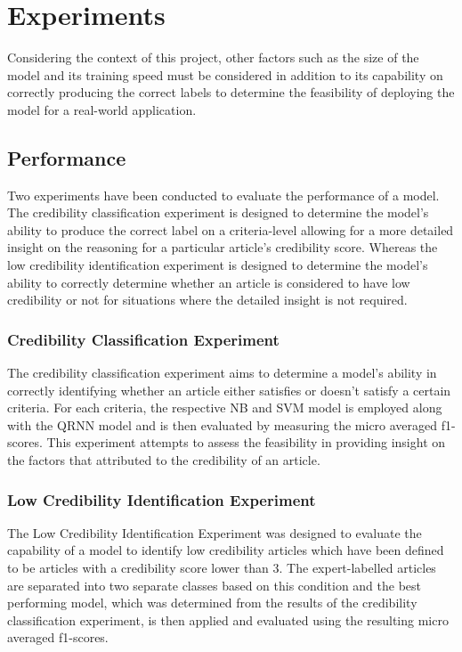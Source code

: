 \documentclass[a4paper,twoside,phd]{BYUPhys}
\begin{document}
\section{Experiments}
\label{sec:Experiments}

Considering the context of this project, other factors such as the size of the model and its training speed must be considered in addition to its capability on correctly producing the correct labels to determine the feasibility of deploying the model for a real-world application. 

\subsection{Performance}
\label{sec:PerformanceExperiments}

Two experiments have been conducted to evaluate the performance of a model. The credibility classification experiment is designed to determine the model's ability to produce the correct label on a criteria-level allowing for a more detailed insight on the reasoning for a particular article's credibility score. Whereas the low credibility identification experiment is designed to determine the model's ability to correctly determine whether an article is considered to have low credibility or not for situations where the detailed insight is not required.

\subsubsection{Credibility Classification Experiment}
\label{sec:CredibilityClassificationExperiment}
The credibility classification experiment aims to determine a model's ability in correctly identifying whether an article either satisfies or doesn't satisfy a certain criteria. For each criteria, the respective NB and SVM model is employed along with the QRNN model and is then evaluated by measuring the micro averaged f1-scores. This experiment attempts to assess the feasibility in providing insight on the factors that attributed to the credibility of an article.


\subsubsection{Low Credibility Identification Experiment}
\label{sec:LowCredibilityIdentification}
The Low Credibility Identification Experiment was designed to evaluate the capability of a model to identify low credibility articles which have been defined to be articles with a credibility score lower than 3. The expert-labelled articles are separated into two separate classes based on this condition and the best performing model, which was determined from the results of the credibility classification experiment, is then applied and evaluated using the resulting micro averaged f1-scores. 
\end{document}

